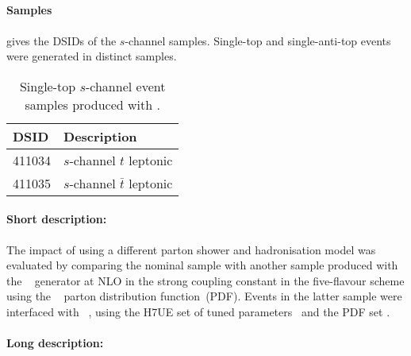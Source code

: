\subsection[Powheg+Herwig7]{\POWHER[7]}
\label{subsubsec:schan_PH7}

\paragraph{Samples}

 gives the DSIDs of the $s$-channel \POWHER[7] samples.
Single-top and single-anti-top events were generated in distinct samples.

\begin{table}[htbp]
  \caption{Single-top $s$-channel event samples produced with \POWHER[7].}%
  \label{tab:schan_PH7}
  \centering
  \begin{tabular}{l l}
    \toprule
    DSID & Description \\
    \midrule
    411034 & $s$-channel $t$ leptonic \\
    411035 & $s$-channel $\bar{t}$ leptonic \\
    \bottomrule
  \end{tabular}
\end{table}

\paragraph{Short description:}

The impact of using a different parton shower and hadronisation model was evaluated by comparing the nominal sample
with another sample produced with the \POWHEGBOX[v2]~\cite{Alioli:2009je,Nason:2004rx,Frixione:2007vw,Alioli:2010xd}
generator at NLO in the strong coupling constant \alphas in the five-flavour scheme using the 
\NNPDF[3.0nlo]~\cite{Ball:2014uwa} parton distribution function~(PDF).
Events in the latter sample were interfaced with \HERWIG[7.04]~\cite{Bahr:2008pv,Bellm:2015jjp}, using the H7UE set of
tuned parameters~\cite{Bellm:2015jjp} and the \MMHT[lo] PDF set \cite{Harland-Lang:2014zoa}.


\paragraph{Long description:}

